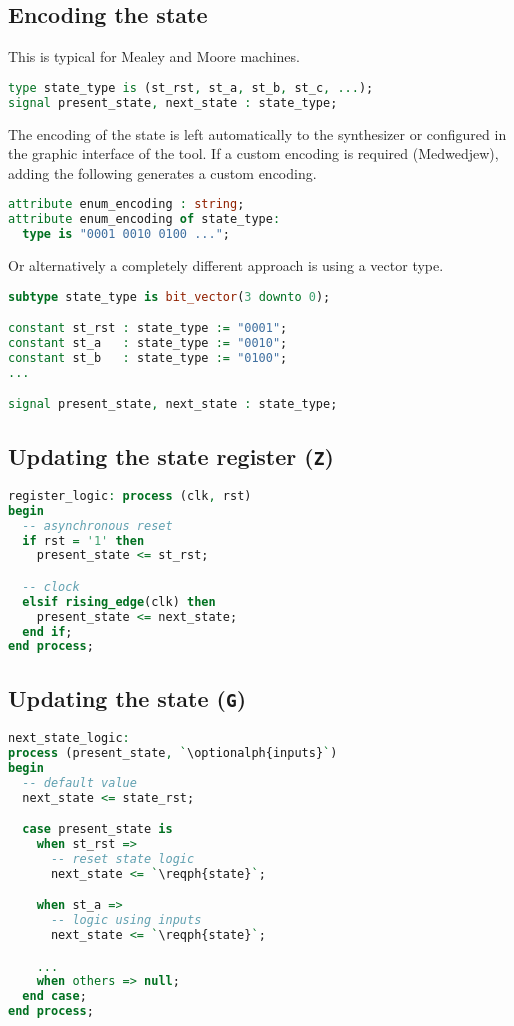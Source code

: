 \subsection{Encoding the state}
This is typical for Mealey and Moore machines.
\begin{lstlisting}[language=vhdl]
type state_type is (st_rst, st_a, st_b, st_c, ...);
signal present_state, next_state : state_type;
\end{lstlisting}
The encoding of the state is left automatically to the synthesizer or
configured in the graphic interface of the tool.  If a custom encoding is
required (Medwedjew), adding the following generates a custom encoding.
\begin{lstlisting}[language=vhdl]
attribute enum_encoding : string;
attribute enum_encoding of state_type:
  type is "0001 0010 0100 ...";
\end{lstlisting}

Or alternatively a completely different approach is using a vector type.
\begin{lstlisting}[language=vhdl]
subtype state_type is bit_vector(3 downto 0);

constant st_rst : state_type := "0001";
constant st_a   : state_type := "0010";
constant st_b   : state_type := "0100";
...

signal present_state, next_state : state_type;
\end{lstlisting}

\subsection{Updating the state register (\texttt{Z})}
\begin{lstlisting}[language=vhdl]
register_logic: process (clk, rst)
begin
  -- asynchronous reset
  if rst = '1' then
    present_state <= st_rst;

  -- clock
  elsif rising_edge(clk) then
    present_state <= next_state;
  end if;
end process;
\end{lstlisting}

\subsection{Updating the state (\texttt{G})}
\begin{lstlisting}[language=vhdl]
next_state_logic:
process (present_state, `\optionalph{inputs}`)
begin
  -- default value
  next_state <= state_rst;

  case present_state is
    when st_rst =>
      -- reset state logic
      next_state <= `\reqph{state}`;

    when st_a =>
      -- logic using inputs
      next_state <= `\reqph{state}`;

    ...
    when others => null;
  end case;
end process;
\end{lstlisting}

